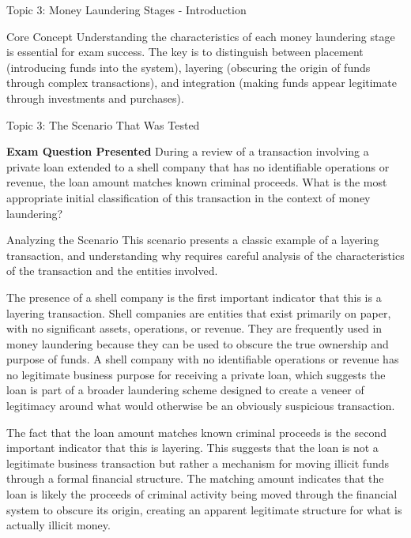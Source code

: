 \documentclass[8pt]{beamer}  %
\begin{document}
\begin{frame}{Topic 3: Money Laundering Stages - Introduction}
		\vspace{0.2cm}
		\begin{alertblock}{Core Concept}
			Understanding the characteristics of each money laundering stage is essential for exam success. The key is to distinguish between placement (introducing funds into the system), layering (obscuring the origin of funds through complex transactions), and integration (making funds appear legitimate through investments and purchases).
		\end{alertblock}
	\end{frame}
	
	\begin{frame}{Topic 3: The Scenario That Was Tested}
		\begin{block}{\large \textbf{Exam Question Presented}}
			During a review of a transaction involving a private loan extended to a shell company that has no identifiable operations or revenue, the loan amount matches known criminal proceeds. What is the most appropriate initial classification of this transaction in the context of money laundering?
		\end{block}
		
		\vspace{0.2cm}
		\begin{block}{\large Analyzing the Scenario}
			This scenario presents a classic example of a layering transaction, and understanding why requires careful analysis of the characteristics of the transaction and the entities involved.
			
			The presence of a shell company is the first important indicator that this is a layering transaction. Shell companies are entities that exist primarily on paper, with no significant assets, operations, or revenue. They are frequently used in money laundering because they can be used to obscure the true ownership and purpose of funds. A shell company with no identifiable operations or revenue has no legitimate business purpose for receiving a private loan, which suggests the loan is part of a broader laundering scheme designed to create a veneer of legitimacy around what would otherwise be an obviously suspicious transaction.
			
			The fact that the loan amount matches known criminal proceeds is the second important indicator that this is layering. This suggests that the loan is not a legitimate business transaction but rather a mechanism for moving illicit funds through a formal financial structure. The matching amount indicates that the loan is likely the proceeds of criminal activity being moved through the financial system to obscure its origin, creating an apparent legitimate structure for what is actually illicit money.
			

\end{block}
\end{frame}
\end{document}
